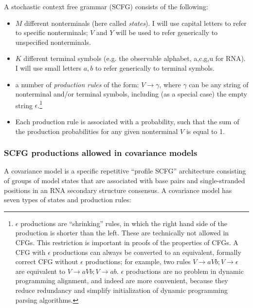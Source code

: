 \documentclass[11pt]{article}
\begin{document}
A stochastic context free grammar (SCFG) consists of the following:

\begin{itemize}
\item $M$ different nonterminals (here called \emph{states}). I will use capital
      letters to refer to specific nonterminals; $V$ and $Y$ will be used
      to refer generically to unspecified nonterminals.
\item $K$ different terminal symbols (e.g. the observable alphabet,
      {a,c,g,u} for RNA). I will use small letters $a,b$ to refer
      generically to terminal symbols.
\item a number of \emph{production rules} of the form: $V \rightarrow
\gamma$, where $\gamma$ can be any string of nonterminal and/or
terminal symbols, including (as a special case) the empty string
$\epsilon$.\footnote{$\epsilon$ productions are ``shrinking'' rules,
in which the right hand side of the production is shorter than the
left. These are technically not allowed in CFGs. This restriction is
important in proofs of the properties of CFGs. A CFG with $\epsilon$
productions can always be converted to an equivalent, formally correct
CFG without $\epsilon$ productions; for example, two rules $V
\rightarrow a V b; V \rightarrow \epsilon$ are equivalent to $V
\rightarrow a V b; V \rightarrow ab$. $\epsilon$ productions are no
problem in dynamic programming alignment, and indeed are more
convenient, because they reduce redundancy and simplify initialization
of dynamic programming parsing algorithms.}
\item Each production rule is associated with a probability, such that
      the sum of the production probabilities for any given
      nonterminal $V$ is equal to 1.
\end{itemize} 

\subsubsection{SCFG productions allowed in covariance models}

A covariance model is a specific repetitive ``profile SCFG''
architecture consisting of groups of model states that are associated
with base pairs and single-stranded positions in an RNA secondary
structure consensus. A covariance model has seven types of states and
production rules:
\end{document}
